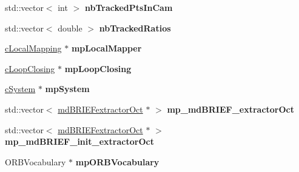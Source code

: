 \begin{DoxyCompactItemize}
\item 
std\+::vector$<$ int $>$ {\bfseries nb\+Tracked\+Pts\+In\+Cam}\hypertarget{classMultiColSLAM_1_1cTracking_a423549a4bb922e4e1e8b9c8023375409}{}\label{classMultiColSLAM_1_1cTracking_a423549a4bb922e4e1e8b9c8023375409}

\item 
std\+::vector$<$ double $>$ {\bfseries nb\+Tracked\+Ratios}\hypertarget{classMultiColSLAM_1_1cTracking_ab3b413af38741b025a9af20902e08afd}{}\label{classMultiColSLAM_1_1cTracking_ab3b413af38741b025a9af20902e08afd}

\item 
\hyperlink{classMultiColSLAM_1_1cLocalMapping}{c\+Local\+Mapping} $\ast$ {\bfseries mp\+Local\+Mapper}\hypertarget{classMultiColSLAM_1_1cTracking_a29459e945e963ce560bc61320adcfc47}{}\label{classMultiColSLAM_1_1cTracking_a29459e945e963ce560bc61320adcfc47}

\item 
\hyperlink{classMultiColSLAM_1_1cLoopClosing}{c\+Loop\+Closing} $\ast$ {\bfseries mp\+Loop\+Closing}\hypertarget{classMultiColSLAM_1_1cTracking_a351f9df81c239f285fce51226fe5d958}{}\label{classMultiColSLAM_1_1cTracking_a351f9df81c239f285fce51226fe5d958}

\item 
\hyperlink{classMultiColSLAM_1_1cSystem}{c\+System} $\ast$ {\bfseries mp\+System}\hypertarget{classMultiColSLAM_1_1cTracking_a901c7e0127ba86072ae4ff70923d12d0}{}\label{classMultiColSLAM_1_1cTracking_a901c7e0127ba86072ae4ff70923d12d0}

\item 
std\+::vector$<$ \hyperlink{classMultiColSLAM_1_1mdBRIEFextractorOct}{md\+B\+R\+I\+E\+Fextractor\+Oct} $\ast$ $>$ {\bfseries mp\+\_\+md\+B\+R\+I\+E\+F\+\_\+extractor\+Oct}\hypertarget{classMultiColSLAM_1_1cTracking_a70d9dc822e50e71defaa247b66734e79}{}\label{classMultiColSLAM_1_1cTracking_a70d9dc822e50e71defaa247b66734e79}

\item 
std\+::vector$<$ \hyperlink{classMultiColSLAM_1_1mdBRIEFextractorOct}{md\+B\+R\+I\+E\+Fextractor\+Oct} $\ast$ $>$ {\bfseries mp\+\_\+md\+B\+R\+I\+E\+F\+\_\+init\+\_\+extractor\+Oct}\hypertarget{classMultiColSLAM_1_1cTracking_ac7abfb0447e423c677eb7b6a6289b6e4}{}\label{classMultiColSLAM_1_1cTracking_ac7abfb0447e423c677eb7b6a6289b6e4}

\item 
O\+R\+B\+Vocabulary $\ast$ {\bfseries mp\+O\+R\+B\+Vocabulary}\hypertarget{classMultiColSLAM_1_1cTracking_a4266ae2d793064fbcef8289d7787b9bd}{}\label{classMultiColSLAM_1_1cTracking_a4266ae2d793064fbcef8289d7787b9bd}


\end{DoxyCompactItemize}
